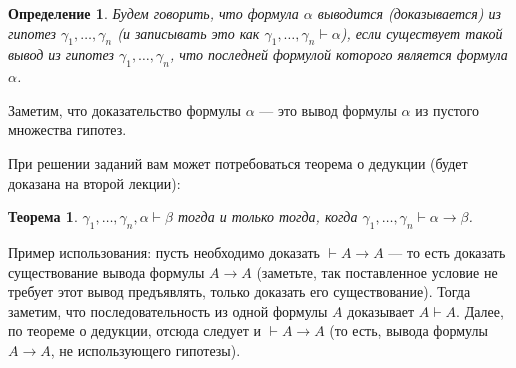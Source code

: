 \documentclass[10pt,a4paper,oneside]{article}
\newtheorem{definition}{Определение}
\newtheorem{theorem}{Теорема}
\begin{document}
\begin{definition}
Будем говорить, что формула $\alpha$ выводится (доказывается) из гипотез $\gamma_1,\dots,\gamma_n$ 
(и записывать это как $\gamma_1,\dots,\gamma_n\vdash\alpha$), если существует такой вывод
из гипотез $\gamma_1,\dots,\gamma_n$, что последней формулой которого является формула $\alpha$.
\end{definition}

Заметим, что доказательство формулы $\alpha$ --- это вывод формулы $\alpha$ из
пустого множества гипотез.

При решении заданий вам может потребоваться теорема о дедукции (будет доказана на второй лекции): 
\begin{theorem}
$\gamma_1,\dots,\gamma_n, \alpha \vdash \beta$ 
тогда и только тогда, когда $\gamma_1,\dots,\gamma_n \vdash \alpha\rightarrow\beta$. 
\end{theorem}

Пример использования: пусть необходимо доказать $\vdash A \rightarrow A$ --- то есть
доказать существование вывода формулы $A \rightarrow A$ (заметьте, так поставленное
условие не требует этот вывод предъявлять, только доказать его существование).
Тогда заметим, что последовательность из одной формулы $A$ доказывает $A \vdash A$. 
Далее, по теореме о дедукции, отсюда следует и $\vdash A \rightarrow A$ 
(то есть, вывода формулы $A \rightarrow A$, не использующего гипотезы).
\end{document}
